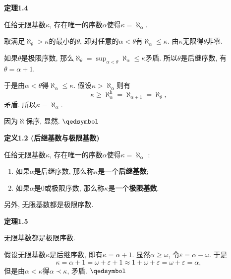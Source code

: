 \documentclass[UTF8]{ctexart}
\begin{document}
\hypertarget{sec:定理1.4}{}
\noindent\textbf{定理1.4}

任给无限基数$\kappa$, 存在唯一的序数$\alpha$使得$\kappa=\aleph_\alpha$.



取满足$\aleph_\theta>\kappa$的最小的$\theta$,
即对任意的$\alpha<\theta$有$\aleph_\alpha\leqslant\kappa$.
由$\kappa$无限得$\theta$非零.

\vspace{3pt}
如果$\theta$是极限序数, 那么$\displaystyle
\aleph_\theta=\sup_{\alpha<\theta}\aleph_\alpha\leqslant\kappa$矛盾.
所以$\theta$是后继序数, 有$\theta=\alpha+1$.

\vspace{3pt}
于是由$\alpha<\theta$得$\aleph_\alpha\leqslant\kappa$.
假设$\kappa>\aleph_\alpha$则有
\[
    \kappa\geqslant\aleph_\alpha^{\mathrm{h}}=\aleph_{\alpha+1}=\aleph_\theta,
\]
矛盾. 所以$\kappa=\aleph_\alpha$.

 因为$\aleph$保序, 显然. \hfill $\qedsymbol$

\vspace{30pt}

\hypertarget{sec:定义1.2}{}
\noindent\textbf{定义1.2 (后继基数与极限基数)}

任给无限基数$\kappa$, 存在唯一的序数$\alpha$使得$\kappa=\aleph_\alpha$ :
\begin{enumerate}
    \item 如果$\alpha$是后继序数, 那么称$\kappa$是一个\textbf{后继基数};
    \item 如果$\alpha$是$0$或极限序数, 那么称$\kappa$是一个\textbf{极限基数}.
\end{enumerate}

\vspace{10pt}

另外, 无限基数都是极限序数.

\vspace{10pt}

\hypertarget{sec:定理1.5}{}
\noindent\textbf{定理1.5}

无限基数都是极限序数.


假设无限基数$\kappa$是后继序数, 即有$\kappa=\alpha+1$. 显然$\alpha\geqslant\omega$,
令$\varepsilon=\alpha-\omega$. 于是
\[
    \kappa=\alpha+1=\omega+\varepsilon+1\approx 1+\omega+\varepsilon=
    \omega+\varepsilon=\alpha,
\]
但是由$\alpha<\kappa$得$\alpha\prec\kappa$, 矛盾. \hfill $\qedsymbol$
\end{document}
